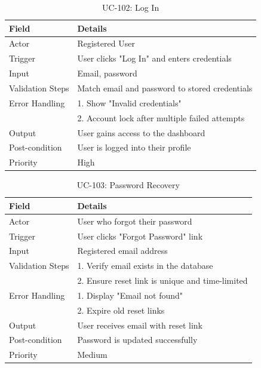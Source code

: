 \begin{table}[H]
\centering
\caption{UC-102: Log In}
\begin{tabular}{|l|p{10cm}|}
\hline
\textbf{Field} & \textbf{Details} \\ \hline
Actor & Registered User \\ \hline
Trigger & User clicks "Log In" and enters credentials \\ \hline
Input & Email, password \\ \hline
Validation Steps & Match email and password to stored credentials \\ \hline
Error Handling & 1. Show "Invalid credentials" \\ 
               & 2. Account lock after multiple failed attempts \\ \hline
Output & User gains access to the dashboard \\ \hline
Post-condition & User is logged into their profile \\ \hline
Priority & High \\ \hline
\end{tabular}
\end{table}

\begin{table}[H]
\centering
\caption{UC-103: Password Recovery}
\begin{tabular}{|l|p{10cm}|}
\hline
\textbf{Field} & \textbf{Details} \\ \hline
Actor & User who forgot their password \\ \hline
Trigger & User clicks "Forgot Password" link \\ \hline
Input & Registered email address \\ \hline
Validation Steps & 1. Verify email exists in the database \\ 
                 & 2. Ensure reset link is unique and time-limited \\ \hline
Error Handling & 1. Display "Email not found" \\ 
               & 2. Expire old reset links \\ \hline
Output & User receives email with reset link \\ \hline
Post-condition & Password is updated successfully \\ \hline
Priority & Medium \\ \hline
\end{tabular}
\end{table}

